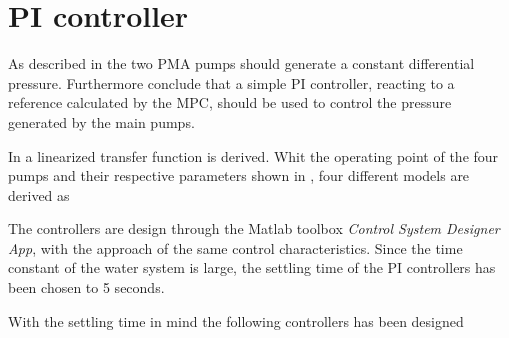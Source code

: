 \section{PI controller}
\label{pressure_control}

As described in  the two PMA pumps should generate a constant differential pressure. Furthermore  conclude that a simple PI controller, reacting to a reference calculated by the MPC, should be used to control the pressure generated by the main pumps. 

In  a linearized transfer function is derived. Whit the operating point of the four pumps and their respective parameters shown in , four different models are derived as 


The controllers are design through the Matlab toolbox \textit{Control System Designer App}\citep{GSTWTCSD}, with the approach of the same control characteristics. Since the time constant of the water system is large, the settling time of the PI controllers has been chosen to 5 seconds. 

With the settling time in mind the following controllers has been designed







